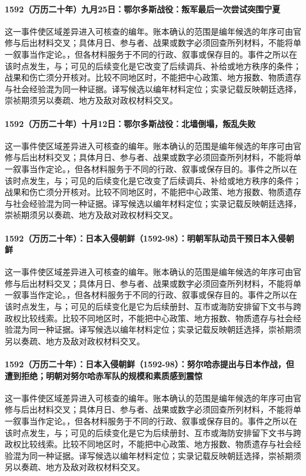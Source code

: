 \paragraph{1592（万历二十年）九月25日：鄂尔多斯战役：叛军最后一次尝试突围宁夏} 这一事件使区域差异进入可核查的编年。账本确认的范围是编年候选的年序可由官修与后出材料交叉；具体月日、参与者、战果或数字必须回查所列材料，不能将单一叙事当作定论。，但各材料服务于不同的行政、叙事或保存目的。事件之所以在该时点发生，与；可见的后续变化是它改变了后续调兵、补给或地方秩序的条件；战果和伤亡须分开核对。比较不同地区时，不能把中心政策、地方报数、物质遗存与社会经验混为同一种证据。译写候选以编年材料定位；实录记载反映朝廷选择，崇祯期须另以奏疏、地方及敌对政权材料交叉。

\paragraph{1592（万历二十年）十月12日：鄂尔多斯战役：北墙倒塌，叛乱失败} 这一事件使区域差异进入可核查的编年。账本确认的范围是编年候选的年序可由官修与后出材料交叉；具体月日、参与者、战果或数字必须回查所列材料，不能将单一叙事当作定论。，但各材料服务于不同的行政、叙事或保存目的。事件之所以在该时点发生，与；可见的后续变化是它改变了后续调兵、补给或地方秩序的条件；战果和伤亡须分开核对。比较不同地区时，不能把中心政策、地方报数、物质遗存与社会经验混为同一种证据。译写候选以编年材料定位；实录记载反映朝廷选择，崇祯期须另以奏疏、地方及敌对政权材料交叉。

\paragraph{1592（万历二十年）：日本入侵朝鲜（1592-98）：明朝军队动员干预日本入侵朝鲜} 这一事件使区域差异进入可核查的编年。账本确认的范围是编年候选的年序可由官修与后出材料交叉；具体月日、参与者、战果或数字必须回查所列材料，不能将单一叙事当作定论。，但各材料服务于不同的行政、叙事或保存目的。事件之所以在该时点发生，与；可见的后续变化是它为后续册封、互市或海防安排留下文书与跨政权比较线索。比较不同地区时，不能把中心政策、地方报数、物质遗存与社会经验混为同一种证据。译写候选以编年材料定位；实录记载反映朝廷选择，崇祯期须另以奏疏、地方及敌对政权材料交叉。

\paragraph{1592（万历二十年）：日本入侵朝鲜（1592-98）：努尔哈赤提出与日本作战，但遭到拒绝；明朝对努尔哈赤军队的规模和素质感到震惊} 这一事件使区域差异进入可核查的编年。账本确认的范围是编年候选的年序可由官修与后出材料交叉；具体月日、参与者、战果或数字必须回查所列材料，不能将单一叙事当作定论。，但各材料服务于不同的行政、叙事或保存目的。事件之所以在该时点发生，与；可见的后续变化是它为后续册封、互市或海防安排留下文书与跨政权比较线索。比较不同地区时，不能把中心政策、地方报数、物质遗存与社会经验混为同一种证据。译写候选以编年材料定位；实录记载反映朝廷选择，崇祯期须另以奏疏、地方及敌对政权材料交叉。


